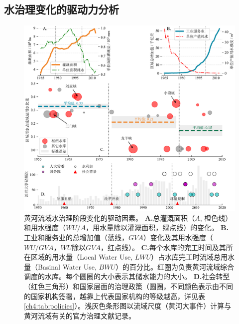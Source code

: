 




\subsection{水治理变化的驱动力分析}\label{ch4:sec:mechanism}

\begin{figure}[th!]
	\centering
	\includegraphics[width=\textwidth]{img/ch4/causes.pdf}
	\caption[黄河流域水治理阶段变化的驱动因素]{
		黄河流域水治理阶段变化的驱动因素。
		\textbf{A.}总灌溉面积（$A$, 橙色线）和用水强度（$WU/A$，用水量除以灌溉面积，绿点线）的变化。
        \textbf{B.}工业和服务业的总增加值（蓝线，$GVA$）变化及其用水强度（$WU/GVA$，$WU$除以$GVA$，红点线）。
        \textbf{C.}每个水库的完工时间及其所在区域的用水量（Local Water Use, $LWU$）占水库完工时流域总用水量（Basinal Water Use, $BWU$）的百分比。红圈为负责黄河流域综合调度的水库。每个圆圈的大小表示其储水能力的大小。
        \textbf{D.}社会转型（红色三角形）和国家层面的治理政策（圆圈，不同颜色表示由不同的国家机构签署，越靠上代表国家机构的等级越高，详见表\ref{ch4:tab:policies}）。浅灰色条形图以流域尺度（黄河大事件）计算与黄河流域有关的官方治理文献记录。}\label{ch4:fig:mechanism}
\end{figure}


